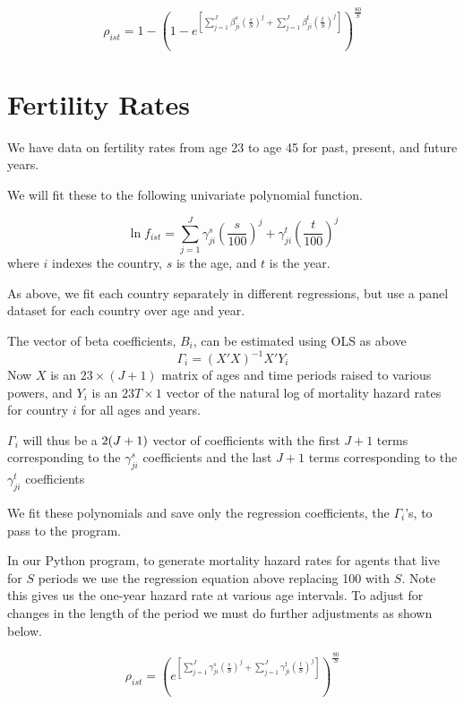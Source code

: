\documentclass[letterpaper,12pt]{article}
\theoremstyle{definition}
\numberwithin{equation}{section}
\begin{document}
\begin{spacing}{1.5}
	\begin{equation}
		\rho_{ist} = 1 - \left(1-e^{\left[\sum_{j=1}^J \beta^s_{ji} \left(\frac{s}{S}\right)^j+\sum_{j=1}^J \beta^t_{ji} \left(\frac{t}{S}\right)^j\right]}\right)^{\frac{80}{S}}
	\end{equation}

\section{Fertility Rates}
	We have data on fertility rates from age 23 to age 45 for past, present, and future years.

	We will fit these to the following univariate polynomial function.

	\begin{equation}
		\ln f_{ist} = \sum_{j=1}^J \gamma^s_{ji} \left(\frac{s}{100}\right)^j + \gamma^t_{ji} \left(\frac{t}{100}\right)^j
	\end{equation}
	where $i$ indexes the country, $s$ is the age, and $t$ is the year.

	As above, we fit each country separately in different regressions, but use a panel dataset for each country over age and year.

	The vector of beta coefficients, $B_{i}$, can be estimated using OLS as above
	\begin{equation}
		\Gamma_i = (X'X)^{-1}X'Y_i
	\end{equation}
	Now $X$ is an $23 \times(J+1)$ matrix of ages and time periods raised to various powers, and $Y_i$ is an $23T \times 1$ vector of the natural log of mortality hazard rates for country $i$ for all ages and years.

	$\Gamma_i$ will thus be a $2(J+1) \time 1$ vector of coefficients with the first $J+1$ terms corresponding to the $\gamma^s_{ji}$ coefficients and the last $J+1$ terms corresponding to the $\gamma^t_{ji}$ coefficients

	We fit these polynomials and save only the regression coefficients, the $\Gamma_i$'s, to pass to the program.

	In our Python program, to generate mortality hazard rates for agents that live for $S$ periods we use the regression equation above replacing 100 with $S$.  Note this gives us the one-year hazard rate at various age intervals.  To adjust for changes in the length of the period we must do further adjustments as shown below.

	\begin{equation}
		\rho_{ist} = \left(e^{\left[\sum_{j=1}^J \gamma^s_{ji} \left(\frac{s}{S}\right)^j+\sum_{j=1}^J \gamma^t_{ji} \left(\frac{t}{S}\right)^j\right]}\right)^{\frac{80}{S}}
	\end{equation}

\end{spacing}
\end{document}
